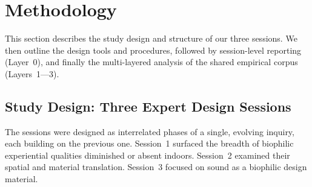 \section{Methodology}
\label{sec:ch5-methodology}

This section describes the study design and structure of our three sessions. We then outline the design tools and procedures, followed by session-level reporting (Layer~0), and finally the multi-layered analysis of the shared empirical corpus (Layers~1---3).

\subsection{Study Design: Three Expert Design Sessions}
\label{subsec:ch5-study-design}
The sessions were designed as interrelated phases of a single, evolving inquiry, each building on the previous one. Session~1 surfaced the breadth of biophilic experiential qualities diminished or absent indoors. Session~2 examined their spatial and material translation. Session~3 focused on sound as a biophilic design material.


